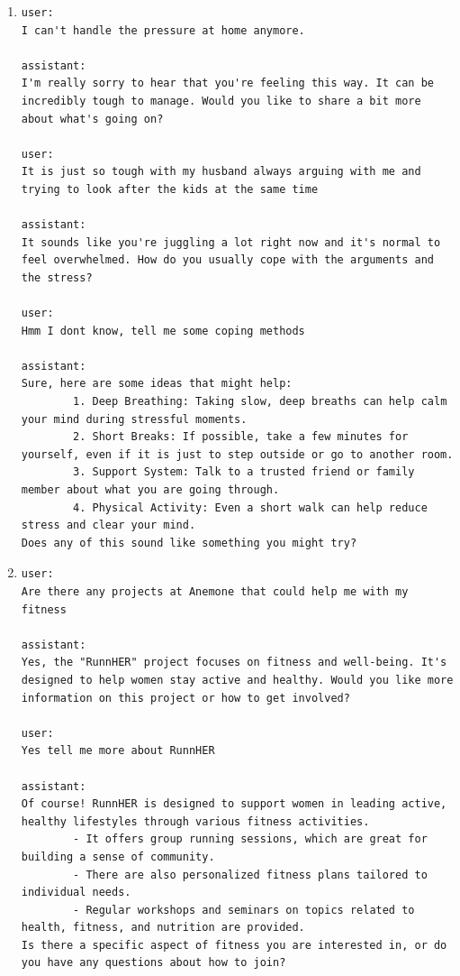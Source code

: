 \begin{enumerate}
    \item
\begin{lstlisting}
user: 
I can't handle the pressure at home anymore.
        
assistant: 
I'm really sorry to hear that you're feeling this way. It can be incredibly tough to manage. Would you like to share a bit more about what's going on?

user: 
It is just so tough with my husband always arguing with me and trying to look after the kids at the same time

assistant: 
It sounds like you're juggling a lot right now and it's normal to feel overwhelmed. How do you usually cope with the arguments and the stress?

user: 
Hmm I dont know, tell me some coping methods

assistant: 
Sure, here are some ideas that might help: 
        1. Deep Breathing: Taking slow, deep breaths can help calm your mind during stressful moments. 
        2. Short Breaks: If possible, take a few minutes for yourself, even if it is just to step outside or go to another room. 
        3. Support System: Talk to a trusted friend or family member about what you are going through. 
        4. Physical Activity: Even a short walk can help reduce stress and clear your mind. 
Does any of this sound like something you might try?
\end{lstlisting}

\item 
\begin{lstlisting}
user: 
Are there any projects at Anemone that could help me with my fitness

assistant: 
Yes, the "RunnHER" project focuses on fitness and well-being. It's designed to help women stay active and healthy. Would you like more information on this project or how to get involved?
	
user: 
Yes tell me more about RunnHER

assistant: 
Of course! RunnHER is designed to support women in leading active, healthy lifestyles through various fitness activities. 
        - It offers group running sessions, which are great for building a sense of community. 
        - There are also personalized fitness plans tailored to individual needs. 
        - Regular workshops and seminars on topics related to health, fitness, and nutrition are provided. 
Is there a specific aspect of fitness you are interested in, or do you have any questions about how to join?
    

\end{lstlisting}
\end{enumerate}
